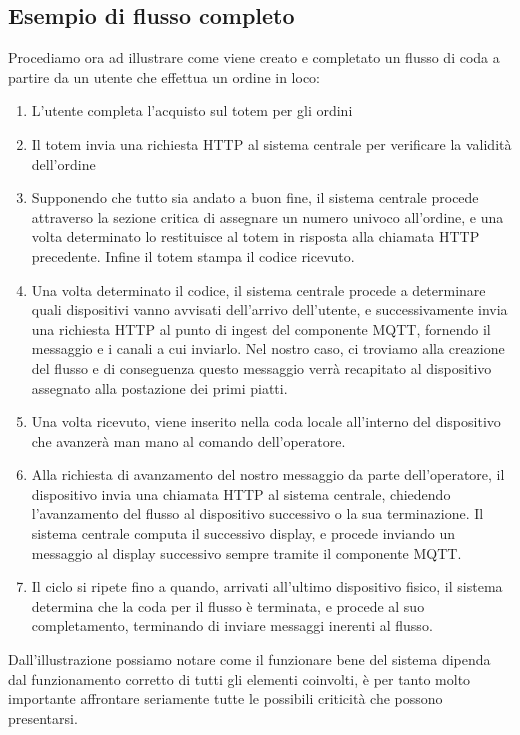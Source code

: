 \documentclass[a4paper, titlepage, 12pt, openright, twoside]{book}
\begin{document}
\subsection{Esempio di flusso completo}
Procediamo ora ad illustrare come viene creato e completato un flusso di coda a partire da un utente che effettua un ordine in loco:
\begin{enumerate}
	\item L'utente completa l'acquisto sul totem per gli ordini
	\item Il totem invia una richiesta HTTP al sistema centrale per verificare la validità dell'ordine
	\item Supponendo che tutto sia andato a buon fine, il sistema centrale procede attraverso la sezione critica di assegnare un numero univoco all'ordine,
		  e una volta determinato lo restituisce al totem in risposta alla chiamata HTTP precedente. Infine il totem stampa il codice ricevuto.
	\item Una volta determinato il codice, il sistema centrale procede a determinare quali dispositivi vanno avvisati dell'arrivo dell'utente, e successivamente
		  invia una richiesta HTTP al punto di ingest del componente MQTT, fornendo il messaggio e i canali a cui inviarlo. Nel nostro caso, ci troviamo alla creazione del flusso e di conseguenza questo messaggio verrà recapitato al dispositivo assegnato alla postazione dei primi piatti.
	\item Una volta ricevuto, viene inserito nella coda locale all'interno del dispositivo che avanzerà man mano al comando dell'operatore.
	\item Alla richiesta di avanzamento del nostro messaggio da parte dell'operatore, il dispositivo invia una chiamata HTTP al sistema centrale, chiedendo l'avanzamento del flusso
		  al dispositivo successivo o la sua terminazione. Il sistema centrale computa il successivo display, e procede inviando un messaggio al display successivo sempre tramite
		  il componente MQTT.
	\item Il ciclo si ripete fino a quando, arrivati all'ultimo dispositivo fisico, il sistema determina che la coda per il flusso è terminata, e procede al suo completamento,
		  terminando di inviare messaggi inerenti al flusso. 
\end{enumerate}

Dall'illustrazione possiamo notare come il funzionare bene del sistema dipenda dal funzionamento corretto di tutti gli elementi coinvolti, è per tanto molto importante affrontare seriamente tutte le possibili criticità che possono presentarsi.
\end{document}
